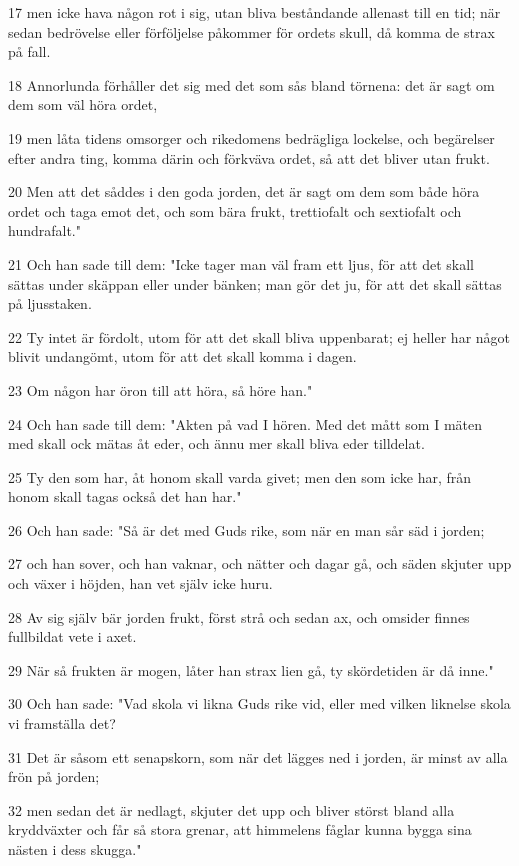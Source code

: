 \par 17 men icke hava någon rot i sig, utan bliva beståndande allenast till en tid; när sedan bedrövelse eller förföljelse påkommer för ordets skull, då komma de strax på fall.
\par 18 Annorlunda förhåller det sig med det som sås bland törnena: det är sagt om dem som väl höra ordet,
\par 19 men låta tidens omsorger och rikedomens bedrägliga lockelse, och begärelser efter andra ting, komma därin och förkväva ordet, så att det bliver utan frukt.
\par 20 Men att det såddes i den goda jorden, det är sagt om dem som både höra ordet och taga emot det, och som bära frukt, trettiofalt och sextiofalt och hundrafalt."
\par 21 Och han sade till dem: "Icke tager man väl fram ett ljus, för att det skall sättas under skäppan eller under bänken; man gör det ju, för att det skall sättas på ljusstaken.
\par 22 Ty intet är fördolt, utom för att det skall bliva uppenbarat; ej heller har något blivit undangömt, utom för att det skall komma i dagen.
\par 23 Om någon har öron till att höra, så höre han."
\par 24 Och han sade till dem: "Akten på vad I hören. Med det mått som I mäten med skall ock mätas åt eder, och ännu mer skall bliva eder tilldelat.
\par 25 Ty den som har, åt honom skall varda givet; men den som icke har, från honom skall tagas också det han har."
\par 26 Och han sade: "Så är det med Guds rike, som när en man sår säd i jorden;
\par 27 och han sover, och han vaknar, och nätter och dagar gå, och säden skjuter upp och växer i höjden, han vet själv icke huru.
\par 28 Av sig själv bär jorden frukt, först strå och sedan ax, och omsider finnes fullbildat vete i axet.
\par 29 När så frukten är mogen, låter han strax lien gå, ty skördetiden är då inne."
\par 30 Och han sade: "Vad skola vi likna Guds rike vid, eller med vilken liknelse skola vi framställa det?
\par 31 Det är såsom ett senapskorn, som när det lägges ned i jorden, är minst av alla frön på jorden;
\par 32 men sedan det är nedlagt, skjuter det upp och bliver störst bland alla kryddväxter och får så stora grenar, att himmelens fåglar kunna bygga sina nästen i dess skugga."
